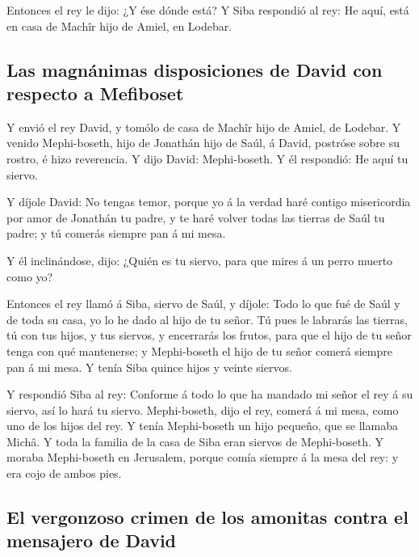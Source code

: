  Entonces el rey le dijo: ¿Y ése dónde está? Y Siba
respondió al rey: He aquí, está en casa de Machîr hijo de Amiel, en
Lodebar.

\hypertarget{las-magnuxe1nimas-disposiciones-de-david-con-respecto-a-mefiboset}{%
\subsection{Las magnánimas disposiciones de David con respecto a
Mefiboset}\label{las-magnuxe1nimas-disposiciones-de-david-con-respecto-a-mefiboset}}

 Y envió el rey David, y tomólo de casa de Machîr hijo de
Amiel, de Lodebar.  Y venido Mephi-boseth, hijo de
Jonathán hijo de Saúl, á David, postróse sobre su rostro, é hizo
reverencia. Y dijo David: Mephi-boseth. Y él respondió: He aquí tu
siervo.

 Y díjole David: No tengas temor, porque yo á la verdad
haré contigo misericordia por amor de Jonathán tu padre, y te haré
volver todas las tierras de Saúl tu padre; y tú comerás siempre pan á mi
mesa.

 Y él inclinándose, dijo: ¿Quién es tu siervo, para que
mires á un perro muerto como yo?

 Entonces el rey llamó á Siba, siervo de Saúl, y díjole:
Todo lo que fué de Saúl y de toda su casa, yo lo he dado al hijo de tu
señor.  Tú pues le labrarás las tierras, tú con tus
hijos, y tus siervos, y encerrarás los frutos, para que el hijo de tu
señor tenga con qué mantenerse; y Mephi-boseth el hijo de tu señor
comerá siempre pan á mi mesa. Y tenía Siba quince hijos y veinte
siervos.

 Y respondió Siba al rey: Conforme á todo lo que ha
mandado mi señor el rey á su siervo, así lo hará tu siervo.
Mephi-boseth, dijo el rey, comerá á mi mesa, como uno de los hijos del
rey.  Y tenía Mephi-boseth un hijo pequeño, que se
llamaba Michâ. Y toda la familia de la casa de Siba eran siervos de
Mephi-boseth.  Y moraba Mephi-boseth en Jerusalem, porque
comía siempre á la mesa del rey: y era cojo de ambos pies.

\hypertarget{el-vergonzoso-crimen-de-los-amonitas-contra-el-mensajero-de-david}{%
\subsection{El vergonzoso crimen de los amonitas contra el mensajero de
David}\label{el-vergonzoso-crimen-de-los-amonitas-contra-el-mensajero-de-david}}

